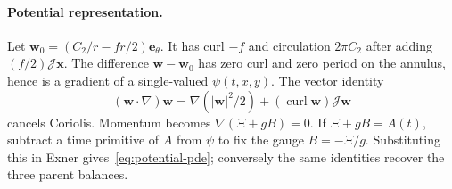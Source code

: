 \documentclass[12pt,a4paper,oneside]{report}
\numberwithin{equation}{chapter}
\theoremstyle{definition}
\theoremstyle{remark}\newtheorem{remark}[theorem]{Remark}
\begin{document}
\paragraph{Potential representation.}
Let $\mathbf w_0=(C_2/r-fr/2)\mathbf e_\theta$. It has curl $-f$ and circulation $2\pi C_2$ after adding $(f/2)\mathcal J\mathbf x$. The difference $\mathbf w-\mathbf w_0$ has zero curl and zero period on the annulus, hence is a gradient of a single-valued $\psi(t,x,y)$. The vector identity
\[
 (\mathbf w\cdot\nabla)\mathbf w
 =\nabla(|\mathbf w|^2/2)+(\operatorname{curl}\mathbf w)\mathcal J\mathbf w
\]
cancels Coriolis. Momentum becomes $\nabla(\Xi+gB)=0$. If $\Xi+gB=A(t)$, subtract a time primitive of $A$ from $\psi$ to fix the gauge $B=-\Xi/g$. Substituting this in Exner gives~\eqref{eq:potential-pde}; conversely the same identities recover the three parent balances.
\end{document}
